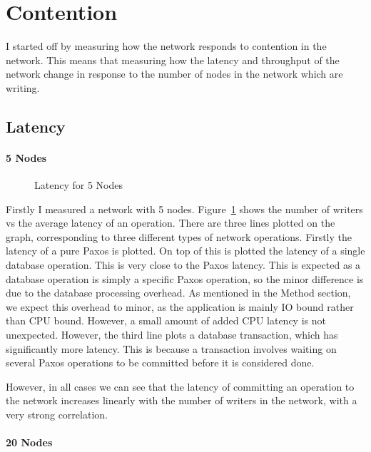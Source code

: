 \documentclass[12pt,twoside,notitlepage]{report}
\newcommand{\lwincludegraphics}[2][]{%
  \sbox{0}{\texttt{[image: \#2]}}%
  \ifdim\wd0>\linewidth
    \resizebox{\linewidth}{!}{\box0 }%
  \else
    \leavevmode\box0
  \fi}
\begin{document}
\section{Contention}

I started off by measuring how the network responds to contention in the network. This means that
measuring how the latency and throughput of the network change in response to the number of nodes
in the network which are writing.

\subsection{Latency}

\paragraph{5 Nodes}

\begin{figure}[htb]
\centering
\lwincludegraphics[scale=2]{figs/lat_5.eps}
\caption{\label{fig:lat-5}Latency for 5 Nodes}
\end{figure}

Firstly I measured a network with 5 nodes. Figure~\ref{fig:lat-5} shows the number of writers vs
the average latency of an operation. There are three lines plotted on the graph, corresponding to
three different types of network operations. Firstly the latency of a pure Paxos is plotted. On
top of this is plotted the latency of a single database operation. This is very close to the Paxos
latency. This is expected as a database operation is simply a specific Paxos operation, so the
minor difference is due to the database processing overhead. As mentioned in the Method section,
we expect this overhead to minor, as the application is mainly IO bound rather than CPU bound.
However, a small amount of added CPU latency is not unexpected. However, the third line plots a
database transaction, which has significantly more latency. This is because a transaction involves
waiting on several Paxos operations to be committed before it is considered done.

However, in all cases we can see that the latency of committing an operation to the
network increases linearly with the number of writers in the network, with a very strong
correlation.

\paragraph{20 Nodes}
\end{document}
